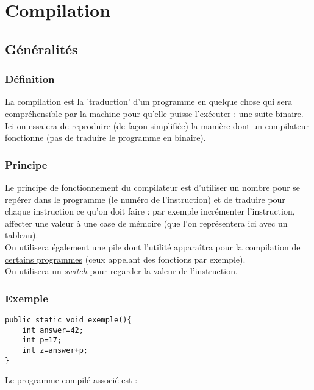 \documentclass[a4paper,10pt]{book} %
\begin{document}





\chapter{Compilation}
\section{Généralités}
\subsection{Définition}
La compilation est la 'traduction' d'un programme en quelque chose qui sera compréhensible par la machine pour qu'elle puisse l’exécuter : une suite binaire.\\

Ici on essaiera de reproduire (de façon simplifiée) la manière dont un compilateur fonctionne (pas de traduire le programme en binaire).

\subsection{Principe}
Le principe de fonctionnement du compilateur est d'utiliser un nombre pour se repérer dans le programme (le numéro de l'instruction) et de traduire pour chaque instruction ce qu'on doit faire : par exemple incrémenter l'instruction, affecter une valeur à une case de mémoire (que l'on représentera ici avec un tableau).\\
On utilisera également une pile dont l'utilité apparaîtra pour la compilation de \hyperref[appel:fonction]{certains programmes} (ceux appelant des fonctions par exemple).\\

On utilisera un \textit{switch} pour regarder la valeur de l'instruction.

\subsection{Exemple}
\begin{lstlisting}
public static void exemple(){
	int answer=42;
	int p=17;
	int z=answer+p;
}
\end{lstlisting}
\bigskip
Le programme compilé associé est :\\
\end{document}
